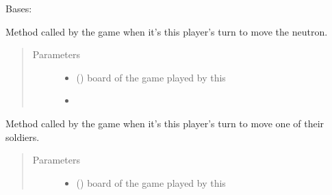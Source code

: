 \documentclass[letterpaper,10pt,english]{sphinxmanual}
\begin{document}
\begin{fulllineitems}
\label{\detokenize{player:player.RandomPlayer}}
Bases: {\hyperref[\detokenize{player:player.Player}]{}}

\begin{fulllineitems}
\label{\detokenize{player:player.RandomPlayer.move_neutron}}
Method called by the game when it’s this player’s turn to move the
neutron.
\begin{quote}\begin{description}
\item[{Parameters}] \leavevmode\begin{itemize}
\item {} 
 ({\hyperref[\detokenize{neutron:neutron.NeutronBoard}]{}}) \textendash{} board of the game played by this

\item {} 
 \textendash{} 

\end{itemize}

\end{description}\end{quote}

\end{fulllineitems}


\begin{fulllineitems}
\label{\detokenize{player:player.RandomPlayer.move_soldier}}
Method called by the game when it’s this player’s turn to move one of
their soldiers.
\begin{quote}\begin{description}
\item[{Parameters}] \leavevmode\begin{itemize}
\item {} 
 ({\hyperref[\detokenize{neutron:neutron.NeutronBoard}]{}}) \textendash{} board of the game played by this


\end{itemize}
\end{description}
\end{quote}
\end{fulllineitems}
\end{fulllineitems}
\end{document}
